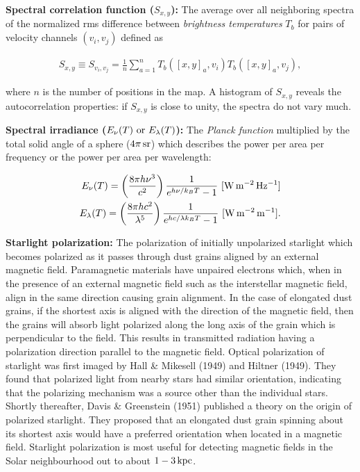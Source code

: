 \documentclass[a4paper,10pt]{article}
\begin{document}
{\noindent}\textbf{Spectral correlation function ($S_{x,y}$):} The average over all neighboring spectra of the normalized rms difference between \textit{brightness temperatures} $T_b$ for pairs of velocity channels $(v_i,v_j)$ defined as

\begin{align*}
    S_{x,y} \equiv S_{v_i,v_j} = \frac{1}{n}\sum_{a=1}^n T_b([x,y]_a,v_i)T_b([x,y]_a,v_j),
\end{align*}

{\noindent}where $n$ is the number of positions in the map. A histogram of $S_{x,y}$ reveals the autocorrelation properties: if $S_{x,y}$ is close to unity, the spectra do not vary much.

{\noindent}\textbf{Spectral irradiance ($E_\nu(T)~{\rm or}~E_\lambda(T)$):} The \textit{Planck function} multiplied by the total solid angle of a sphere ($4\pi\,{\rm sr}$) which describes the power per area per frequency or the power per area per wavelength:

\begin{align*}
    E_\nu(T) = \left(\frac{8\pi h\nu^3}{c^2}\right) \frac{1}{e^{h\nu/k_BT}-1} ~ [{\rm W\,m^{-2}\,Hz^{-1}}] \\
    E_\lambda(T) = \left(\frac{8\pi hc^2}{\lambda^5}\right) \frac{1}{e^{hc/\lambda k_BT}-1} ~ [{\rm W\,m^{-2}\,m^{-1}}].
\end{align*}

{\noindent}\textbf{Starlight polarization:} The polarization of initially unpolarized starlight which becomes polarized as it passes through dust grains aligned by an external magnetic field. Paramagnetic materials have unpaired electrons which, when in the presence of an external magnetic field such as the interstellar magnetic field, align in the same direction causing grain alignment. In the case of elongated dust grains, if the shortest axis is aligned with the direction of the magnetic field, then the grains will absorb light polarized along the long axis of the grain which is perpendicular to the field. This results in transmitted radiation having a polarization direction parallel to the magnetic field. Optical polarization of starlight was first imaged by Hall \& Mikesell (1949) and Hiltner (1949). They found that polarized light from nearby stars had similar orientation, indicating that the polarizing mechanism was a source other than the individual stars. Shortly thereafter, Davis \& Greenstein (1951) published a theory on the origin of polarized starlight. They proposed that an elongated dust grain spinning about its shortest axis would have a preferred orientation when located in a magnetic field. Starlight polarization is most useful for detecting magnetic fields in the Solar neighbourhood out to about $1-3\,{\rm kpc}$.
\end{document}

